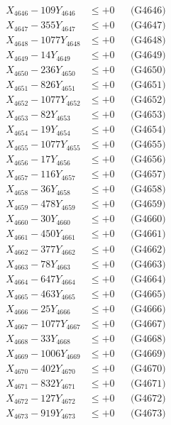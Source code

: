 \documentclass[a4paper,10pt]{article}
\begin{document}
{\begin{align}
X_{4646} - 109Y_{4646} &\leq +0 && \text{(G4646)} \\
X_{4647} - 355Y_{4647} &\leq +0 && \text{(G4647)} \\
X_{4648} - 1077Y_{4648} &\leq +0 && \text{(G4648)} \\
X_{4649} - 14Y_{4649} &\leq +0 && \text{(G4649)} \\
X_{4650} - 236Y_{4650} &\leq +0 && \text{(G4650)} \\
\allowbreak
X_{4651} - 826Y_{4651} &\leq +0 && \text{(G4651)} \\
X_{4652} - 1077Y_{4652} &\leq +0 && \text{(G4652)} \\
X_{4653} - 82Y_{4653} &\leq +0 && \text{(G4653)} \\
X_{4654} - 19Y_{4654} &\leq +0 && \text{(G4654)} \\
X_{4655} - 1077Y_{4655} &\leq +0 && \text{(G4655)} \\
X_{4656} - 17Y_{4656} &\leq +0 && \text{(G4656)} \\
X_{4657} - 116Y_{4657} &\leq +0 && \text{(G4657)} \\
X_{4658} - 36Y_{4658} &\leq +0 && \text{(G4658)} \\
X_{4659} - 478Y_{4659} &\leq +0 && \text{(G4659)} \\
X_{4660} - 30Y_{4660} &\leq +0 && \text{(G4660)} \\
\allowbreak
X_{4661} - 450Y_{4661} &\leq +0 && \text{(G4661)} \\
X_{4662} - 377Y_{4662} &\leq +0 && \text{(G4662)} \\
X_{4663} - 78Y_{4663} &\leq +0 && \text{(G4663)} \\
X_{4664} - 647Y_{4664} &\leq +0 && \text{(G4664)} \\
X_{4665} - 463Y_{4665} &\leq +0 && \text{(G4665)} \\
X_{4666} - 25Y_{4666} &\leq +0 && \text{(G4666)} \\
X_{4667} - 1077Y_{4667} &\leq +0 && \text{(G4667)} \\
X_{4668} - 33Y_{4668} &\leq +0 && \text{(G4668)} \\
X_{4669} - 1006Y_{4669} &\leq +0 && \text{(G4669)} \\
X_{4670} - 402Y_{4670} &\leq +0 && \text{(G4670)} \\
\allowbreak
X_{4671} - 832Y_{4671} &\leq +0 && \text{(G4671)} \\
X_{4672} - 127Y_{4672} &\leq +0 && \text{(G4672)} \\
X_{4673} - 919Y_{4673} &\leq +0 && \text{(G4673)} \\

\end{align}}
\end{document}
